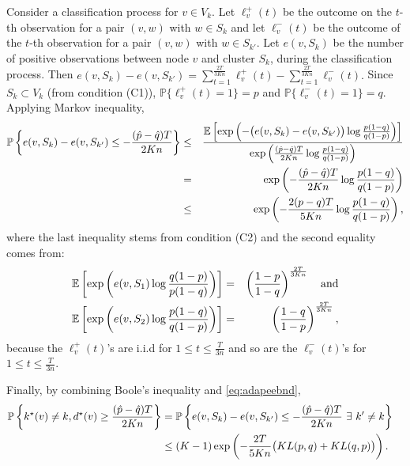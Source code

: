 Consider a classification process for $v\in V_k$. Let $\ell^+_v(t)$ be the outcome on the $t$-th observation for a pair $(v,w)$ with $w\in S_k$
and let $\ell^-_v(t)$ be the outcome of the $t$-th observation for a pair $(v,w)$ with $w\in S_{k'}$. Let $e(v,S_k)$ be the number of positive observations between node $v$ and cluster $S_k$, during the classification process. Then $e(v,S_k)- e(v,S_{k'} ) = \sum_{t=1}^{\frac{2T}{3Kn}}\ell^+_v
(t) -\sum_{t=1}^{\frac{2T}{3Kn}}\ell^-_v (t).$ Since $S_k \subset
V_k$ (from condition (C1)), $\mathbb{P}\{\ell^+_v (t) =1 \} =p$ and $\mathbb{P}\{\ell^-_v (t) =1 \} =q.$
Applying Markov inequality,
\begin{eqnarray}
\mathbb{P} \left\{ e(v,S_k) - e(v,S_{k'}) \le - \frac{( \hat{p} - \hat{q})T}{2Kn} \right\} &\le&
\frac{{\mathbb E} \left[ \exp \left( - \big( e(v,S_k) - e(v,S_{k'}) \big) \log \frac{p(1-q)}{q(1-p)} 
    \right)  \right]}{\exp\left( \frac{( \hat{p} - \hat{q})T}{2Kn} \log \frac{p(1-q)}{q(1-p)}\right)}
     \cr 
&= &\exp\left(-  \frac{(
    \hat{p} - \hat{q})T}{2Kn} \log \frac{p(1-q)}{q(1-p)} \right) \cr& \le& \exp\left(-  \frac{2(
    p - q)T}{5Kn} \log \frac{p(1-q)}{q(1-p)} \right), \label{eq:adapeebnd}
\end{eqnarray}
where the last inequality stems from condition (C2) and the second
equality comes from:
\begin{eqnarray*} 
{\mathbb E} \left[ \exp \left( e(v,S_1)\log \frac{q(1-p)}{p(1-q)} \right)  \right] &=&
\left(  \frac{1-p}{1-q}  \right)^{\frac{ 2T}{3Kn}}  \quad \mbox{and}  \cr
{\mathbb E} \left[ \exp \left( e(v,S_2)\log \frac{p(1-q)}{q(1-p)} \right)  \right] &=&
\left(  \frac{1-q}{1-p}  \right)^{\frac{ 2T}{3Kn}}, 
\end{eqnarray*}
because the $\ell^+_{v}(t)$'s are i.i.d for $1\le t \le \frac{T}{3n}$ and so are the $\ell^-_{v}(t)$'s for $1\le t \le \frac{T}{3n}$.

Finally, by combining Boole's inequality and \eqref{eq:adapeebnd},
\begin{align*}
\mathbb{P} \left\{ k^{\star}(v) \neq k, d^{\star}(v)  \ge
  \frac{(\hat{p}-\hat{q})T}{2Kn}   \right\}  &= \mathbb{P} \left\{
  e(v,S_k) - e(v,S_{k'}) \le - \frac{( \hat{p} -
    \hat{q})T}{2Kn}~\exists~k'\neq k \right\} \cr
&\le (K-1)\exp\left(-\frac{2T}{5Kn} \big( KL(p,q)
  + KL(q , p) \big) \right).
\end{align*}




